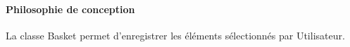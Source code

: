 \paragraph{Philosophie de conception}
La classe Basket permet d'enregistrer les éléments sélectionnés par Utilisateur.\\